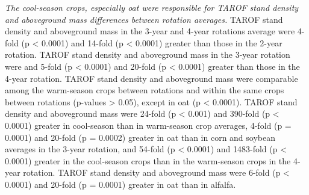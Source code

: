 \documentclass[
]{article}
\begin{document}
\emph{The cool-season crops, especially oat were responsible for TAROF stand density and aboveground mass differences between rotation averages.} TAROF stand density and aboveground mass in the 3-year and 4-year rotations average were 4-fold (p \textless{} 0.0001) and 14-fold (p \textless{} 0.0001) greater than those in the 2-year rotation. TAROF stand density and aboveground mass in the 3-year rotation were and 5-fold (p \textless{} 0.0001) and 20-fold (p \textless{} 0.0001) greater than those in the 4-year rotation. TAROF stand density and aboveground mass were comparable among the warm-season crops between rotations and within the same crops between rotations (p-values \textgreater{} 0.05), except in oat (p \textless{} 0.0001). TAROF stand density and aboveground mass were 24-fold (p \textless{} 0.001) and 390-fold (p \textless{} 0.0001) greater in cool-season than in warm-season crop averages, 4-fold (p = 0.0001) and 20-fold (p = 0.0002) greater in oat than in corn and soybean averages in the 3-year rotation, and 54-fold (p \textless{} 0.0001) and 1483-fold (p \textless{} 0.0001) greater in the cool-season crops than in the warm-season crops in the 4-year rotation. TAROF stand density and aboveground mass were 6-fold (p \textless{} 0.0001) and 20-fold (p = 0.0001) greater in oat than in alfalfa.
\end{document}
